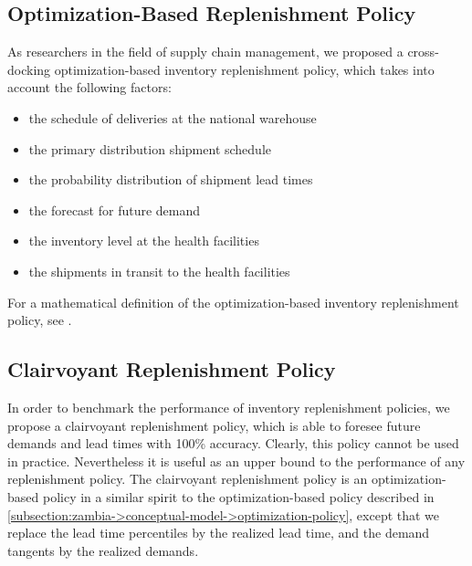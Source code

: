 \subsection{Optimization-Based Replenishment Policy}
\label{subsection:zambia->conceptual-model->optimization-policy}

As researchers in the field of supply chain management,
we proposed a cross-docking optimization-based inventory replenishment policy,
which takes into account the following factors:
\begin{itemize}
\item the schedule of deliveries at the national warehouse
\item the primary distribution shipment schedule
\item the probability distribution of shipment lead times
\item the forecast for future demand
\item the inventory level at the health facilities
\item the shipments in transit to the health facilities
\end{itemize}

For a mathematical definition of the optimization-based
inventory replenishment policy,
see \citet{gallien-leung-yadav-2014}.





\subsection{Clairvoyant Replenishment Policy}

In order to benchmark the performance of inventory replenishment policies,
we propose a clairvoyant replenishment policy,
which is able to foresee future demands and lead times with 100\% accuracy.
Clearly, this policy cannot be used in practice.
Nevertheless it is useful as an upper bound to the performance
of any replenishment policy.
The clairvoyant replenishment policy is an optimization-based policy
in a similar spirit to the optimization-based policy
described in \autoref{subsection:zambia->conceptual-model->optimization-policy},
except that we replace the lead time percentiles by the realized lead time,
and the demand tangents by the realized demands.

